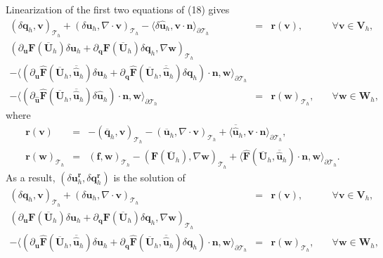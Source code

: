 \documentclass[11pt]{article}
\begin{document}
Linearization of the first two equations of (18) gives
\begin{equation}
\begin{array}{rcll}
(\delta \bm{q}_h, \bm{v})_{\mathcal{T}_h} + (\delta \bm{u}_h, \nabla \cdot \bm{v})_{\mathcal{T}_h} - \langle \delta \widehat{\bm{u}}_h, \bm{v} \cdot \bm{n} \rangle_{\partial \mathcal{T}_h}  & = & \bm{r}(\bm{v}), & \quad \forall \bm{v} \in \bm{V}_h, \\[2ex] 
(\partial_{\bm{u}} \bm{F} (\overline{\bm{U}}_h) \delta \bm{u}_h + \partial_{\bm{q}} \bm{F} (\overline{\bm{U}}_h) \delta \bm{q}_h, \nabla \bm{w})_{\mathcal{T}_h} & & \\[2ex]
- \langle (\partial_{\bm{u}} \widehat{\bm{F}} (\overline{\bm{U}}_h,\overline{\widehat{\bm{u}}}_h) \delta \bm{u}_h + \partial_{{\bm{q}}} \widehat{\bm{F}} (\overline{\bm{U}}_h,\overline{\widehat{\bm{u}}}_h) \delta {\bm{q}}_h) \cdot \bm{n}, \bm{w} \rangle_{\partial \mathcal{T}_h} & & \\[2ex]
 - \langle (\partial_{\widehat{\bm{u}}} \widehat{\bm{F}} (\overline{\bm{U}}_h, \overline{\widehat{\bm{u}}}_h) \delta \widehat{\bm{u}}_h) \cdot \bm{n}, \bm{w} \rangle_{\partial \mathcal{T}_h}   & = &  \bm{r}(\bm{w})_{\mathcal{T}_h},  & \quad \forall \bm{w} \in \bm{W}_h,
\end{array}
\end{equation}
where
\begin{equation}
\begin{array}{rcl}
 \bm{r}(\bm{v}) & = & -(\overline{\bm{q}}_h, \bm{v})_{\mathcal{T}_h} - (\overline{\bm{u}}_h, \nabla \cdot \bm{v})_{\mathcal{T}_h} + \langle \overline{\widehat{\bm{u}}}_h, \bm{v} \cdot \bm{n} \rangle_{\partial \mathcal{T}_h},  \\[2ex]
\bm{r}(\bm{w})_{\mathcal{T}_h} & = & (\bm{f}, \bm{w})_{\mathcal{T}_h} - (\bm{F} (\overline{\bm{U}}_h), \nabla \bm{w})_{\mathcal{T}_h} + \langle \widehat{\bm{F}} (\overline{\bm{U}}_h, \overline{\widehat{\bm{u}}}_h) \cdot \bm{n}, \bm{w} \rangle_{\partial \mathcal{T}_h} .
\end{array}
\end{equation}
As a result, $(\delta \bm{u}_h^{\bm{r}},\delta \bm{q}_h^{\bm{r}})$ is the solution of
\begin{equation}
\begin{array}{rcll}
(\delta \bm{q}_h, \bm{v})_{\mathcal{T}_h} + (\delta \bm{u}_h, \nabla \cdot \bm{v})_{\mathcal{T}_h}  & = & \bm{r}(\bm{v}), & \quad \forall \bm{v} \in \bm{V}_h, \\[2ex] 
(\partial_{\bm{u}} \bm{F} (\overline{\bm{U}}_h) \delta \bm{u}_h + \partial_{\bm{q}} \bm{F} (\overline{\bm{U}}_h) \delta \bm{q}_h, \nabla \bm{w})_{\mathcal{T}_h} & & \\[2ex]
- \langle (\partial_{\bm{u}} \widehat{\bm{F}} (\overline{\bm{U}}_h, \overline{\widehat{\bm{u}}}_h) \delta \bm{u}_h + \partial_{{\bm{q}}} \widehat{\bm{F}} (\overline{\bm{U}}_h, \overline{\widehat{\bm{u}}}_h) \delta {\bm{q}}_h) \cdot \bm{n}, \bm{w} \rangle_{\partial \mathcal{T}_h}  & = &  \bm{r}(\bm{w})_{\mathcal{T}_h},  & \quad \forall \bm{w} \in \bm{W}_h,
\end{array}
\end{equation}
\end{document}
